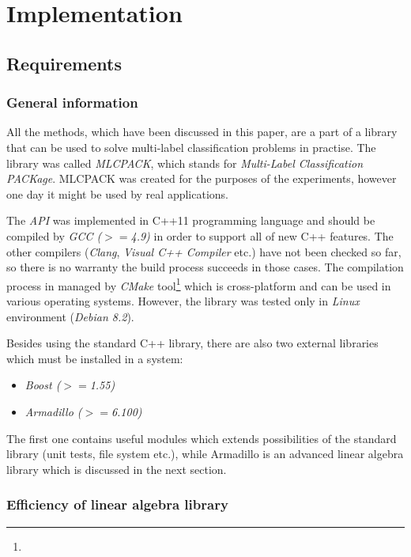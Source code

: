 \chapter{Implementation}

\section{Requirements}

\subsection{General information}
All the methods, which have been discussed in this paper, are a part of a library that can be used to solve multi-label classification problems in practise. The library was called \textit{MLCPACK}, which stands for \textit{Multi-Label Classification PACKage}. MLCPACK was created for the purposes of the experiments, however one day it might be used by real applications. 

The \textit{API} was implemented in C++11 programming language and should be compiled by \textit{GCC ($>=$4.9)} in order to support all of new C++ features. The other compilers (\textit{Clang}, \textit{Visual C++ Compiler} etc.) have not been checked so far, so there is no warranty the build process succeeds in those cases.  The compilation process in managed by \textit{CMake} tool\footnote{} which is cross-platform and can be used in various operating systems. However, the library was tested only in \textit{Linux} environment (\textit{Debian 8.2}). 

Besides using the standard C++ library, there are also two external libraries which must be installed in a system: 

\begin{itemize}
    \item \textit{Boost ($>=$1.55)}
    \item \textit{Armadillo ($>=$6.100)}
\end{itemize}
The first one contains useful modules which extends possibilities of the standard library (unit tests, file system etc.), while Armadillo is an advanced linear algebra library which is discussed in the next section.  


\subsection{Efficiency of linear algebra library}

